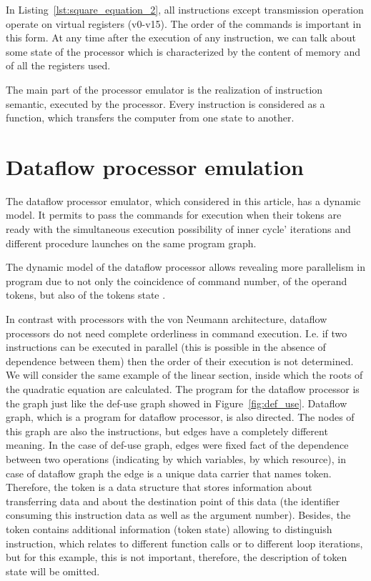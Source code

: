 \documentclass[
11pt,%
tightenlines,%
twoside,%
onecolumn,%
nofloats,%
nobibnotes,%
nofootinbib,%
superscriptaddress,%
noshowpacs,%
centertags]%
{revtex4}
\begin{document}
In Listing~\ref{lst:square_equation_2}, all instructions except transmission operation operate on virtual registers (v0-v15).
The order of the commands is important in this form.
At any time after the execution of any instruction, we can talk about some state of the processor which is characterized by the content of memory and of all the registers used.

The main part of the processor emulator is the realization of instruction semantic, executed by the processor.
Every instruction is considered as a function, which transfers the computer from one state to another.

\section{Dataflow processor emulation}

The dataflow processor emulator, which considered in this article,
has a dynamic model. It permits to pass the commands for execution
when their tokens are ready with the simultaneous execution
possibility of inner cycle' iterations and different procedure
launches on the same program graph.

The dynamic model of the dataflow processor allows revealing more parallelism in program due to not only the coincidence of command number, of the operand tokens, but also of the tokens state \cite{Wiley}.

In contrast with processors with the von Neumann architecture, dataflow processors do not need complete orderliness in command execution.
I.e. if two instructions can be executed in parallel (this is possible in the absence of dependence between them) then the order of their execution is not determined.
We will consider the same example of the linear section, inside which the roots of the quadratic equation are calculated.
The program for the dataflow processor is the graph just like the def-use graph showed in Figure~\ref{fig:def_use}.
Dataflow graph, which is a program for dataflow processor, is also directed.
The nodes of this graph are also the instructions, but edges have a completely different meaning.
In the case of def-use graph, edges were fixed fact of the dependence between two operations (indicating by which variables, by which resource), in case of dataflow graph the edge is a unique data carrier that names token.
Therefore, the token is a data structure that stores information about transferring data and about the destination point of this data (the identifier consuming this instruction data as well as the argument number).
Besides, the token contains additional information (token state) allowing to distinguish instruction, which relates to different function calls or to different loop iterations, but for this example, this is not important, therefore, the description of token state will be omitted.
\end{document}
